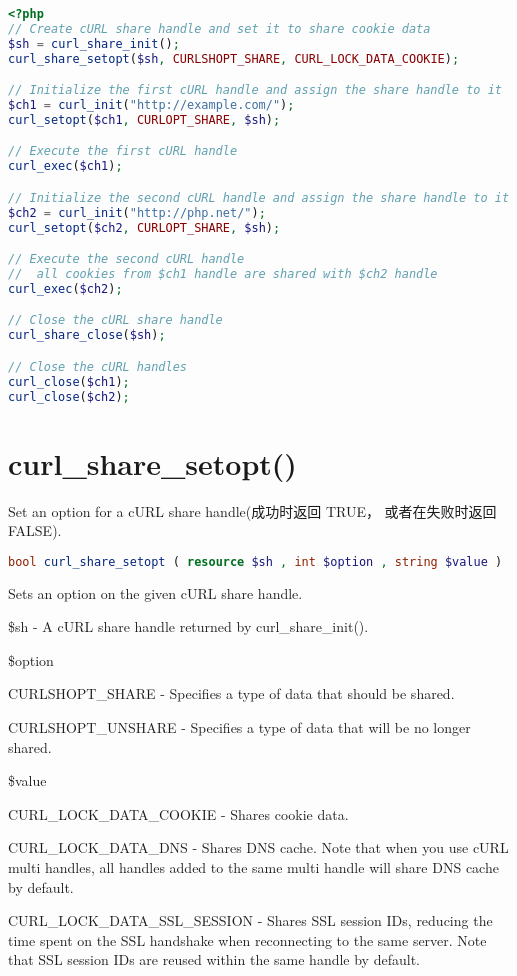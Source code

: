\begin{lstlisting}[language=PHP]
<?php
// Create cURL share handle and set it to share cookie data
$sh = curl_share_init();
curl_share_setopt($sh, CURLSHOPT_SHARE, CURL_LOCK_DATA_COOKIE);

// Initialize the first cURL handle and assign the share handle to it
$ch1 = curl_init("http://example.com/");
curl_setopt($ch1, CURLOPT_SHARE, $sh);

// Execute the first cURL handle
curl_exec($ch1);

// Initialize the second cURL handle and assign the share handle to it
$ch2 = curl_init("http://php.net/");
curl_setopt($ch2, CURLOPT_SHARE, $sh);

// Execute the second cURL handle
//  all cookies from $ch1 handle are shared with $ch2 handle
curl_exec($ch2);

// Close the cURL share handle
curl_share_close($sh);

// Close the cURL handles
curl_close($ch1);
curl_close($ch2);
\end{lstlisting}

\section{curl\_share\_setopt()}

Set an option for a cURL share handle(成功时返回 TRUE， 或者在失败时返回 FALSE).

\begin{lstlisting}[language=PHP]
bool curl_share_setopt ( resource $sh , int $option , string $value )
\end{lstlisting}

Sets an option on the given cURL share handle.

\begin{compactitem}
\item \$sh - A cURL share handle returned by curl\_share\_init().

\item \$option

\begin{compactenum}
\item CURLSHOPT\_SHARE - Specifies a type of data that should be shared.
\item CURLSHOPT\_UNSHARE - Specifies a type of data that will be no longer shared.
\end{compactenum}

\item \$value

\begin{compactenum}
\item CURL\_LOCK\_DATA\_COOKIE - Shares cookie data.
\item CURL\_LOCK\_DATA\_DNS - Shares DNS cache. Note that when you use cURL multi handles, all handles added to the same multi handle will share DNS cache by default.
\item CURL\_LOCK\_DATA\_SSL\_SESSION - Shares SSL session IDs, reducing the time spent on the SSL handshake when reconnecting to the same server. Note that SSL session IDs are reused within the same handle by default.
\end{compactenum}
\end{compactitem}


